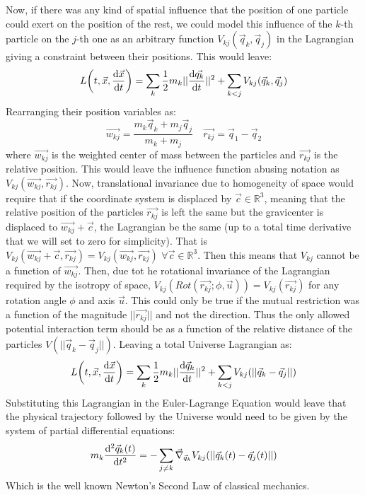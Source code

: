 \documentclass[11pt, a4paper]{article} %
\newcommand{\R}{\mathbb{R}} %
\begin{document}
Now, if there was any kind of spatial influence that the position of one particle could exert on the position of the rest, we could model this influence of the $k$-th particle on the $j$-th one as an arbitrary function $V_{kj}(\vec{q}_k, \vec{q}_j)$ in the Lagrangian giving a constraint between their positions. This would leave:
\begin{equation}
L\qty(t, \vec{x}, \dv{\vec{x}}{t})=\sum_{k}\frac{1}{2}m_k||\dv{\vec{q_k}}{t}||^2+\sum_{k<j}V_{kj}(\vec{q}_k, \vec{q}_j)
\end{equation}
Rearranging their position variables as:
\begin{equation}
\vec{w_{kj}}=\frac{m_k\vec{q}_k+m_j\vec{q}_j}{m_k+m_j} \quad \vec{r_{kj}}=\vec{q}_1-\vec{q}_2
\end{equation}
where $\vec{w_{kj}}$ is the weighted center of mass between the particles and $\vec{r_{kj}}$ is the relative position. This would leave the influence function abusing notation as $V_{kj}(\vec{w_{kj}}, \vec{r_{kj}})$. Now, translational invariance due to homogeneity of space would require that if the coordinate system is displaced by $\vec{c}\in\R^3$, meaning that the relative position of the particles $\vec{r_{kj}}$ is left the same but the gravicenter is displaced to $\vec{w_{kj}}+\vec{c}$, the Lagrangian be the same (up to a total time derivative that we will set to zero for simplicity). That is $V_{kj}(\vec{w_{kj}}+\vec{c},\vec{r_{kj}})=V_{kj}(\vec{w_{kj}},\vec{r_{kj}})$ $\forall \vec{c}\in\R^3$. Then this means that $V_{kj}$ cannot be a function of $\vec{w_{kj}}$. Then, due tot he rotational invariance of the Lagrangian required by the isotropy of space, $V_{kj}(Rot(\vec{r_{kj}};\phi, \vec{u}))=V_{kj}(\vec{r_{kj}})$ for any rotation angle $\phi$ and axis $\vec{u}$. This could only be true if the mutual restriction was a function of the magnitude $||\vec{r_{kj}}||$ and not the direction. Thus the only allowed potential interaction term should be as a function of the relative distance of the particles $V(||\vec{q}_k-\vec{q}_j||)$. Leaving a total Universe Lagrangian as:
\begin{equation}
L\qty(t, \vec{x}, \dv{\vec{x}}{t})=\sum_{k}\frac{1}{2} m_k||\dv{\vec{q}_k}{t}||^2+\sum_{k<j} V_{kj}(||\vec{q}_k-\vec{q}_j||)
\end{equation}
Substituting this Lagrangian in the Euler-Lagrange Equation would leave that the physical trajectory followed by the Universe would need to be given by the system of partial differential equations:
\begin{equation}
m_k \dv[2]{\vec{q}_k(t)}{t} = -\sum_{j\neq k}\vec{\nabla}_{\vec{q}_k} V_{kj}(||\vec{q}_k(t)-\vec{q}_j(t)||)
\end{equation}
Which is the well known Newton's Second Law of classical mechanics.
\end{document}
